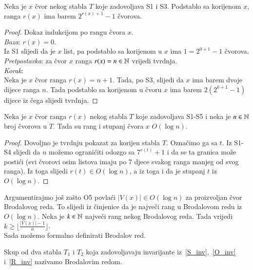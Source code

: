 \begin{lem}\label{Exp_cv}
  Neka je $x$ \v{c}vor nekog stabla $T$ koje zadovoljava S1 i S3. Podstablo sa korijenom $x$, ranga $r(x)$ ima barem $2^{r(x)+1} - 1$ \v{c}vorova.
\end{lem}
\begin{proof}
  Dokaz indukcijom po rangu \v{c}vora $x$.\\
  \emph{Baza}: $r(x) = 0$.\\
  \indent Iz S1 slijedi da je $x$ list, pa podstablo sa korijenom u $x$ ima $1 = 2^{0 + 1} - 1$ \v{c}vorova.\\
  \emph{Pretpostavka}: za \v{c}vor $x$ ranga $r(x) = n \in \mathbb{N}$ vrijedi tvrdnja.\\
  \emph{Korak}:\\
  \indent Neka je $x$ \v{c}vor ranga $r(x) = n+1$. Tada, po S3, slijedi da $x$ ima barem dvoje dijece ranga $n$. Tada podstablo sa korijenom u \v{c}voru $x$ ima barem $2(2^{k + 1} - 1)$ dijece iz \v{c}ega slijedi tvrdnja.
\end{proof}

\begin{lem}\label{Log_cv}
  Neka je $x$ \v{c}vor ranga $r(x)$ nekog stabla $T$ koje zadovoljava S1-S5 i neka je $n \in \mathbb{N}$ broj \v{c}vorova u $T$. Tada su rang i stupanj \v{c}vora $x$ $O(\log n)$.
\end{lem}
\begin{proof}
  Dovoljno je tvrdnju pokazat za korijen stabla $T$. Ozna\v{c}imo ga sa $t$.
  Iz S1-S4 slijedi da $n$ mo\v{z}emo ograni\'{c}iti odozgo sa $7^{r(t)} + 1$ i da se ta granica mo\v{z}e posti\'{c}i (svi \v{c}vorovi osim listova imaju po 7 djece svakog ranga manjeg od svog ranga).
  Iz toga slijedi $r(t) \in O(\log n)$, a iz toga i da je stupanj $t$ iz $O(\log n)$.
\end{proof}


Argumentirajmo jo\v{s} za\v{s}to O5 povla\'{c}i $|V(x)| \in O(\log n)$ za proizvoljan \v{c}vor Brodalovog reda.
To slijedi iz \v{c}injenice da je najve\v{c}i rang u Brodalovom redu iz $O(\log n)$.
Neka je $k \in \mathbb{N}$ najve\v{c}i rang nekog Brodalovog reda.
Tada vrijedi $k \ge \lfloor\frac{|V(x)| - 1}{\alpha}\rfloor$.\\
Sada mo\v{z}emo formalno definirati Brodalov red.
\begin{defn}
  Skup od dva stabla $T_{1}$ i $T_{2}$ koja zadovoljavaju invarijante iz~\ref{S_inv},~\ref{O_inv} i~\ref{R_inv} nazivamo Brodalovim redom.
\end{defn}

